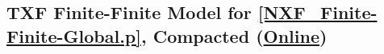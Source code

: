 \documentclass{easychair}
\begin{document}
\begin{minipage}{\textwidth}
\subsection{TXF Finite-Finite Model for \ref{NXF_Finite-Finite-Global.p}, Compacted
(\href{https://raw.githubusercontent.com/GeoffsPapers/InterpretationFormat/master/Examples/NXF_Finite-Finite-Global_Compact.s}{Online})}
\label{NXF_Finite-Finite-Global_Compact.s}
\begin{scriptsize}

\end{scriptsize}
\end{minipage}

\end{document}
